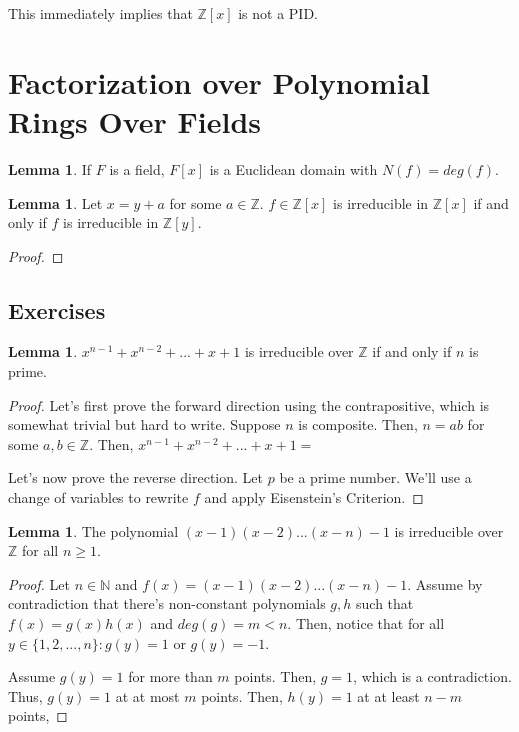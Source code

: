 \documentclass{article}
\theoremstyle{definition}
\newtheorem{lemma}[theorem]{Lemma}
\newcommand{\Z}{\mathbb{Z}}
\begin{document}
This immediately implies that $\Z[x]$ is not a PID. 

\newpage

\section{Factorization over Polynomial Rings Over Fields}

\begin{lemma}
    If $F$ is a field, $F[x]$ is a Euclidean domain with $N(f) = deg(f)$.
\end{lemma}



\begin{lemma}
    Let $x = y + a$ for some $a \in \mathbb{Z}$. $f \in \mathbb{Z}[x]$ is irreducible in $\mathbb{Z}[x]$ if and only if $f$ is irreducible in $\mathbb{Z}[y]$.
\end{lemma}
\begin{proof}
    
\end{proof}

\subsection{Exercises}

\begin{lemma}
    $x^{n-1} + x^{n-2} + ... + x + 1$ is irreducible over $\mathbb{Z}$ if and only if $n$ is prime.
\end{lemma}
\begin{proof}
    Let's first prove the forward direction using the contrapositive, which is somewhat trivial but hard to write. Suppose $n$ is composite. Then, $n = ab$ for some $a,b \in \mathbb{Z}$. Then, $x^{n-1} + x^{n-2} + ... + x + 1 = $

    Let's now prove the reverse direction. Let $p$ be a prime number. We'll use a change of variables to rewrite $f$ and apply Eisenstein's Criterion.
\end{proof}

\begin{lemma}
    The polynomial $(x-1)(x-2)...(x-n) - 1$ is irreducible over $\mathbb{Z}$ for all $n \geq 1$.
\end{lemma}
\begin{proof}
    Let $n \in \mathbb{N}$ and $f(x) = (x-1)(x-2)...(x-n) - 1$. Assume by contradiction that there's non-constant polynomials $g,h$ such that $f(x) = g(x)h(x)$ and $deg(g) = m < n$. Then, notice that for all $y \in \{1,2,...,n\}: g(y) = 1$ or $g(y) = -1$. 
    
    Assume $g(y) = 1$ for more than $m$ points. Then, $g = 1$, which is a contradiction. Thus, $g(y) = 1$ at at most $m$ points. Then, $h(y) = 1$ at at least $n - m$ points, 
\end{proof}
\end{document}

